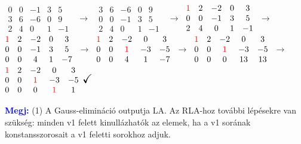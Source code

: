 \documentclass[../szamtud.tex]{subfiles}
\begin{document}
        $ \begin{matrix}
            0 & 0 & -1 & 3 & 5 \\
            3 & 6 & -6 & 0 & 9 \\
            2 & 4 & 0 & 1 & -1 
        \end{matrix}  $
        $\;\rightarrow\;$
        $ \begin{matrix}
            3 & 6 & -6 & 0 & 9 \\
            0 & 0 & -1 & 3 & 5 \\
            2 & 4 & 0 & 1 & -1 
        \end{matrix}  $
        $\;\rightarrow\;$
        $ \begin{matrix}
            \textcolor{red}{1} & 2 & -2 & 0 & 3 \\
            0 & 0 & -1 & 3 & 5 \\
            2 & 4 & 0 & 1 & -1 
        \end{matrix}  $
        $\;\rightarrow\;$
        $ \begin{matrix}
            \textcolor{red}{1} & 2 & -2 & 0 & 3 \\
            0 & 0 & -1 & 3 & 5 \\
            0 & 0 & 4 & 1 & -7 
        \end{matrix}  $
        $\;\rightarrow\;$
        $ \begin{matrix}
            \textcolor{red}{1} & 2 & -2 & 0 & 3 \\
            0 & 0 & \textcolor{red}{1} & -3 & -5 \\
            0 & 0 & 4 & 1 & -7 
        \end{matrix}  $
        $\;\rightarrow\;$
        $ \begin{matrix}
            \textcolor{red}{1} & 2 & -2 & 0 & 3 \\
            0 & 0 & \textcolor{red}{1} & -3 & -5 \\
            0 & 0 & 0 & 13 & 13 
        \end{matrix}  $
        $\;\rightarrow\;$
        $ \begin{matrix}
            \textcolor{red}{1} & 2 & -2 & 0 & 3 \\
            0 & 0 & \textcolor{red}{1} & -3 & -5 \\
            0 & 0 & 0 & \textcolor{red}{1} & 1 
        \end{matrix}  $
        $\Large\checkmark$

        \textcolor{blue}{\textbf{Megj:}} (1) A Gauss-elimináció outputja LA. Az RLA-hoz további lépésekre van szükség: minden v1 felett kinullázhatók az elemek, ha a v1 sorának konstansszorosait a v1 feletti sorokhoz adjuk.
\end{document}
